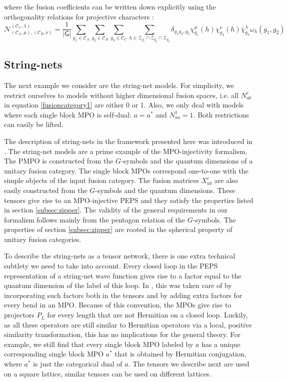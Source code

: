 \documentclass[12 pt]{article}
\begin{document}
where the fusion coefficients can be written down explicitly using the orthogonality relations for projective characters \cite{orbifold,DijkgraafWitten}:
\begin{equation}
    \mathscr{N}_{(\mathcal{C}_A,\mu),(\mathcal{C}_B,\nu)}^{(\mathcal{C}_C,\lambda)} = \frac{1}{|\mathsf{G}|}\sum_{g_1\in \mathcal{C}_A} \sum_{g_2\in\mathcal{C}_B}\sum_{g_3 \in \mathcal{C}_C}\sum_{h\in\mathcal{Z}_{g_1}\cap \mathcal{Z}_{g_2}\cap \mathcal{Z}_{g_3}} \delta_{g_1g_2, g_3}\chi_{g_1}^\mu(h)\chi^\nu_{g_2}(h)\bar{\chi}^{\lambda}_{g_3}\omega_h(g_1,g_2)
\end{equation}


\subsection{String-nets}
The next example we consider are the string-net models. For simplicity, we restrict ourselves to models without higher dimensional fusion spaces, i.e. all $N_{ab}^c$ in equation \eqref{fusioncategory1} are either 0 or 1. Also, we only deal with models where each single block MPO is self-dual: $a=a^*$ and $N_{aa}^1=1$. Both restrictions can easily be lifted.

The description of string-nets in the framework presented here was introduced in \cite{MPOpaper}. The string-net models are a prime example of the MPO-injectivity formalism. The PMPO is constructed from the $G$-symbols and the quantum dimensions of a unitary fusion category. The single block MPOs correspond one-to-one with the simple objects of the input fusion category. The fusion matrices $X_{ab}^c$ are also easily constructed from the $G$-symbols and the quantum dimensions. These tensors give rise to an MPO-injective PEPS and they satisfy the properties listed in section \ref{subsec:zipper}. The validity of the general requirements in our formalism follows mainly from the pentagon relation of the $G$-symbols. The properties of section \ref{subsec:zipper} are rooted in the spherical property of unitary fusion categories.

To describe the string-nets as a tensor network, there is one extra technical subtlety we need to take into account. Every closed loop in the PEPS representation of a string-net wave function gives rise to a factor equal to the quantum dimension of the label of this loop. In \cite{MPOpaper}, this was taken care of by incorporating such factors both in the tensors and by adding extra factors for every bend in an MPO. Because of this convention, the MPOs give rise to projectors $P_L$ for every length that are not Hermitian on a closed loop. Luckily, as all these operators are still similar to Hermitian operators via a local, positive similarity transformation, this has no implications for the general theory. For example, we still find that every single block MPO labeled by $a$ has a unique corresponding single block MPO $a^*$ that is obtained by Hermitian conjugation, where $a^*$ is just the categorical dual of $a$. The tensors we describe next are used on a square lattice, similar tensors can be used on different lattices.
\end{document}
